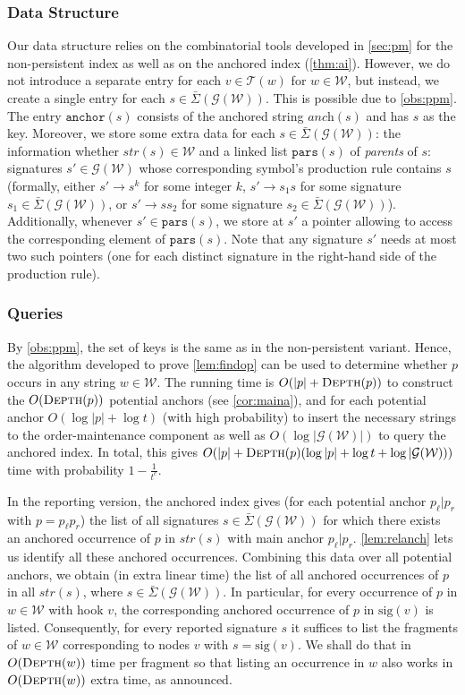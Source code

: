\documentclass[a4paper]{article}
\theoremstyle{remark}
\newcommand{\sigs}{\bar{\Sigma}}
\newcommand{\depth}{\textsc{Depth}}
\newcommand{\grammar}{\mathcal{G}}
\newcommand{\sanch}{\textit{anch}}
\newcommand{\stree}{\mathcal{T}}
\newcommand{\sstr}{\textit{str}}
\newcommand{\spars}{\mathtt{pars}}
\newcommand{\ussig}{\mathrm{sig}}
\newcommand{\coll}{\mathcal{W}}
\newcommand{\itanch}{\mathtt{anchor}}
\begin{document}
\subsubsection{Data Structure}
Our data structure relies on the combinatorial tools developed in \cref{sec:pm} for the non-persistent index as
well as on the anchored index (\cref{thm:ai}).
However, we do not introduce a separate entry for each $v\in \stree(w)$ for $w\in \coll$,
but instead, we create a single entry for each $s \in \sigs(\grammar(\coll))$. This is possible due to \cref{obs:ppm}.
The entry $\itanch(s)$ consists of the anchored string $\sanch(s)$ and has $s$ as the key. 
Moreover, we store some extra data for each $s\in \sigs(\grammar(\coll))$: the information whether $\sstr(s)\in \coll$ and a linked
list $\spars(s)$ of \emph{parents} of $s$: signatures $s'\in \grammar(\coll)$ whose corresponding
symbol's production rule contains $s$
(formally, either $s'\to s^k$ for some integer $k$, $s'\to s_1s$ for some signature $s_1\in \sigs(\grammar(\coll))$, or $s'\to ss_2$ for some signature $s_2\in \sigs(\grammar(\coll))$).
Additionally, whenever $s'\in \spars(s)$, we store at $s'$ a pointer allowing to access the corresponding element of $\spars(s)$.
Note that any signature $s'$ needs at most two such pointers (one for each distinct signature in the right-hand side of the production rule).
 
\subsubsection{Queries}
By \cref{obs:ppm}, the set of keys is the same as in the non-persistent variant. 
Hence, the algorithm developed to prove \cref{lem:findop} can be used to determine whether $p$ occurs in any string $w\in \coll$.
The running time is $O(|p|+\depth(p))$ to construct the $O(\depth(p))$ potential anchors (see \cref{cor:maina}),
and for each potential anchor $O(\log |p|+\log t)$ (with high probability) to insert the necessary strings to the order-maintenance component
as well as $O(\log |\grammar(\coll)|)$ to query the anchored index.
In total, this gives $O(|p|+\depth(p)(\log |p|+\log t + \log |\grammar(\coll)))$ time with probability $1-\frac{1}{t^c}$.

In the reporting version, the anchored index gives (for each potential anchor $p_\ell|p_r$ with $p=p_\ell p_r$) the list of all signatures $s\in \sigs(\grammar(\coll))$ for which there exists an anchored occurrence of $p$ in $\sstr(s)$ with main anchor $p_\ell|p_r$.
\cref{lem:relanch} lets us identify all these anchored occurrences. Combining this data over all potential anchors,
we obtain (in extra linear time) the list of all anchored occurrences of $p$ in all $\sstr(s)$, where $s\in \sigs(\grammar(\coll))$.
In particular, for every occurrence of $p$ in $w\in \coll$ with hook $v$, the corresponding anchored occurrence of $p$ in $\ussig(v)$ 
is listed. 
Consequently, for every reported signature $s$ it suffices to list the fragments of $w\in \coll$ corresponding to nodes $v$ with $s=\ussig(v)$.
We shall do that in $O(\depth(w))$ time per fragment so that listing an occurrence in $w$ also works in $O(\depth(w))$ extra time, as announced.
\end{document}

